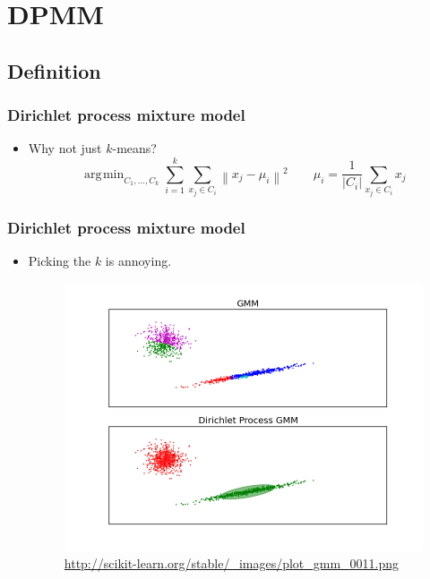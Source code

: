 \documentclass{beamer}
\DeclareMathOperator*{\argmin}{arg\!\min}
\newcommand{\norm}[1]{\left\lVert #1 \right\rVert}
\newcommand{\abs}[1]{\ensuremath{\left| #1 \right|}}
\begin{document}
\section{DPMM}
\subsection{Definition}

\begin{frame}
\frametitle{Dirichlet process mixture model}
\begin{itemize}
  \item Why not just $k$-means?
    \begin{equation*}
      \argmin_{C_1, ..., C_k} \sum_{i=1}^{k} \sum_{x_j \in C_i} \norm{ x_j - \mu_i }^2 \qquad \mu_i = \frac{1}{\abs{C_i}} \sum_{x_j \in C_i} x_j
    \end{equation*}
\end{itemize}
\end{frame}


\begin{frame}
\frametitle{Dirichlet process mixture model}
\begin{itemize}
  \item Picking the $k$ is annoying.
    \begin{figure}
    \includegraphics[scale=0.3]{images/plot_gmm_0011.png}
    \caption{\url{http://scikit-learn.org/stable/_images/plot_gmm_0011.png}}
    \end{figure}
\end{itemize}
\end{frame}
\end{document}
